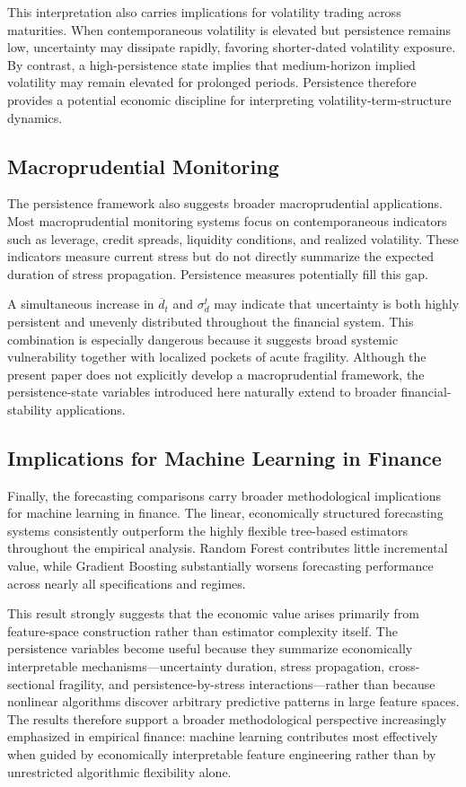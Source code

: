 \documentclass[unnumsec,webpdf,contemporary,large]{oup-authoring-template}%
\theoremstyle{thmstyleone}%
\theoremstyle{thmstyletwo}%
\theoremstyle{thmstylethree}%
\begin{document}
This interpretation also carries implications for volatility trading across
maturities. When contemporaneous volatility is elevated but persistence
remains low, uncertainty may dissipate rapidly, favoring shorter-dated
volatility exposure. By contrast, a high-persistence state implies that
medium-horizon implied volatility may remain elevated for prolonged periods.
Persistence therefore provides a potential economic discipline for
interpreting volatility-term-structure dynamics.

\subsection{Macroprudential Monitoring}

The persistence framework also suggests broader macroprudential
applications. Most macroprudential monitoring systems focus on
contemporaneous indicators such as leverage, credit spreads, liquidity
conditions, and realized volatility. These indicators measure current
stress but do not directly summarize the expected duration of stress
propagation. Persistence measures potentially fill this gap.

A simultaneous increase in $\overline d_t$ and $\sigma_d^t$ may indicate
that uncertainty is both highly persistent and unevenly distributed
throughout the financial system. This combination is especially dangerous
because it suggests broad systemic vulnerability together with localized
pockets of acute fragility. Although the present paper does not explicitly
develop a macroprudential framework, the persistence-state variables
introduced here naturally extend to broader financial-stability
applications.

\subsection{Implications for Machine Learning in Finance}

Finally, the forecasting comparisons carry broader methodological
implications for machine learning in finance. The linear, economically
structured forecasting systems consistently outperform the highly flexible
tree-based estimators throughout the empirical analysis. Random Forest
contributes little incremental value, while Gradient Boosting substantially
worsens forecasting performance across nearly all specifications and
regimes.

This result strongly suggests that the economic value arises primarily from
feature-space construction rather than estimator complexity itself. The
persistence variables become useful because they summarize economically
interpretable mechanisms---uncertainty duration, stress propagation,
cross-sectional fragility, and persistence-by-stress interactions---rather than because nonlinear algorithms discover arbitrary predictive
patterns in large feature spaces. The results therefore support a broader
methodological perspective increasingly emphasized in empirical finance:
machine learning contributes most effectively when guided by economically
interpretable feature engineering rather than by unrestricted algorithmic
flexibility alone.
\end{document}
